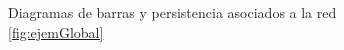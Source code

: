 \documentclass[12pt, a4paper, twoside]{book}
\numberwithin{equation}{section}
\theoremstyle{definition}
\newenvironment{ejem}
  {\pushQED{\qed}\renewcommand{\qedsymbol}{$\blacktriangleleft$}\ejemplo}
  {\popQED\endejemplo}
\theoremstyle{remark}
\theoremstyle{plain}
\begin{document}
\begin{ejem}
	\begin{figure}[!htbp]
			\begin{figure}[H]
			\end{figure}
		\endminipage
			\begin{figure}[H]
			\end{figure}
		\endminipage
		\caption{Diagramas de barras y persistencia asociados a la red 
		\ref{fig:ejemGlobal}}
		\label{fig:ejemLocalDiag}
	\end{figure}
	

\end{ejem}
\end{document}
